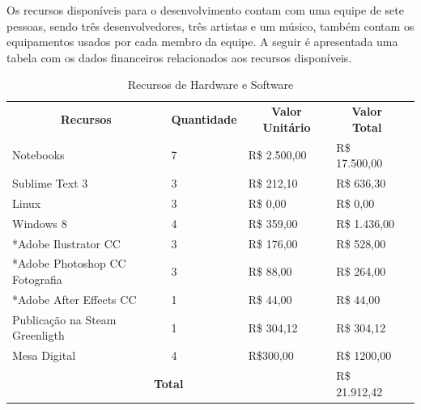 \documentclass[12pt]{article}
\begin{document}
Os recursos disponíveis para o desenvolvimento contam com uma equipe de sete pessoas, sendo três desenvolvedores, três artistas e um músico, também contam os equipamentos usados por cada membro da equipe. A seguir é apresentada uma tabela com os dados financeiros relacionados aos recursos disponíveis.

\begin{table}[h]
\centering
\begin{tabular}{|l|l|l|l|l}
\cline{1-4}
\multicolumn{1}{|c|}{\textbf{Recursos}} & \multicolumn{1}{c|}{\textbf{Quantidade}} & \multicolumn{1}{c|}{\textbf{Valor Unitário}} & \multicolumn{1}{c|}{\textbf{Valor Total}} &  \\ \cline{1-4}
Notebooks                               & 7                                        & R\$ 2.500,00                                  & R\$ 17.500,00                             &  \\ \cline{1-4}
Sublime Text 3                          & 3                                        & R\$ 212,10                                   & R\$ 636,30                                &  \\ \cline{1-4}
Linux                                   & 3                                        & R\$ 0,00                                     & R\$ 0,00                                  &  \\ \cline{1-4}
Windows 8                               & 4                                        & R\$ 359,00                                   & R\$ 1.436,00                              &  \\ \cline{1-4}
*Adobe Ilustrator CC                    & 3                                        & R\$ 176,00                                   & R\$ 528,00                                &  \\ \cline{1-4}
*Adobe Photoshop CC Fotografia          & 3                                        & R\$ 88,00                                    & R\$ 264,00                                &  \\ \cline{1-4}
*Adobe After Effects CC &1 &R\$ 44,00 & R\$ 44,00
& \\ \cline{1-4}
Publicação na Steam Greenligth          & 1                                        & R\$ 304,12                                   & R\$ 304,12                                &  \\ \cline{1-4}
Mesa Digital &4  & R\$300,00  & R\$ 1200,00
& \\ \cline{1-4}
\multicolumn{3}{|c|}{\textbf{Total}}                                                                                              & R\$ 21.912,42                             &  \\ \cline{1-4}
\end{tabular}
\caption {Recursos de Hardware e Software}
\end{table}
\end{document}
